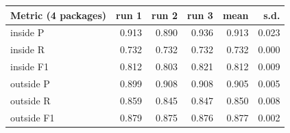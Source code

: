 \begin{tabular}{l rrr rr}
\toprule
Metric (4 packages) & run 1 & run 2 & run 3 & mean & s.d.\\
\midrule
inside P & 0.913 & 0.890 & 0.936 & 0.913 & 0.023 \\
inside R & 0.732 & 0.732 & 0.732 & 0.732 & 0.000 \\
inside F1 & 0.812 & 0.803 & 0.821 & 0.812 & 0.009 \\
outside P & 0.899 & 0.908 & 0.908 & 0.905 & 0.005 \\
outside R & 0.859 & 0.845 & 0.847 & 0.850 & 0.008 \\
outside F1 & 0.879 & 0.875 & 0.876 & 0.877 & 0.002 \\
\bottomrule
\end{tabular}
